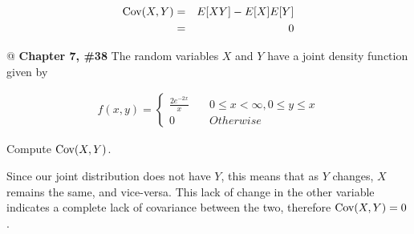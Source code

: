 \documentclass[11pt]{article}\usepackage[]{graphicx}\usepackage[]{xcolor}
\begin{document}
\begin{easylist}[enumerate]
    \begin{equation*}
        \begin{aligned}
            \text{Cov}(X, Y) &=& E[XY] - E[X]E[Y]\\
            &=& 0
        \end{aligned}
    \end{equation*}

    @ \textbf{Chapter 7, \#38} The random variables $X$ and $Y$ have a joint density function given by

    \begin{equation*}
        \begin{aligned}
            f(x, y) =
            \begin{cases}
                \frac{2 e^{-2x} }{x} &\quad 0 \le x < \infty, 0 \le y \le x\\
                0 &\quad Otherwise
            \end{cases}
        \end{aligned}
    \end{equation*}

    Compute $\text{Cov}(X, Y)$.\newline

    Since our joint distribution does not have $Y$, this means that as $Y$ changes, $X$ remains the same, and
    vice-versa. This lack of change in the other variable indicates a complete lack of covariance between the two,
    therefore $\text{Cov}(X, Y) = 0$.

\end{easylist}
\end{document}
